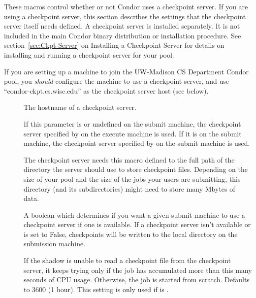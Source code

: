 These macros control whether or not Condor uses a checkpoint server.
If you are using a checkpoint server, this section
describes the settings that the checkpoint server itself needs
defined.  A checkpoint server is installed
separately. It is not included in the main Condor binary
distribution or installation procedure.  See
section~\ref{sec:Ckpt-Server} on Installing a Checkpoint Server
for details on installing and running a checkpoint server for your
pool.

\Note If you are setting up a machine to join the UW-Madison CS
Department Condor pool, you \emph{should} configure the machine to
use a checkpoint server, and use ``condor-ckpt.cs.wisc.edu'' as the
checkpoint server host (see below).

\begin{description}
  
\item[] \label{param:CkptServerHost} The
  hostname of a checkpoint server.

\item[]
  \label{param:StarterChoosesCkptServer} If this parameter is  
  or undefined on
  the submit machine, the checkpoint server specified by
   on the execute machine is used.  If it is
   on the submit machine, the checkpoint server
  specified by  on the submit machine is
  used.
  
\item[] \label{param:CkptServerDir} The
  checkpoint server needs this macro defined to the full path of the
  directory the server should use to store checkpoint files.
  Depending on the size of your pool and the size of the jobs your
  users are submitting, this directory (and its subdirectories) might
  need to store many Mbytes of data.

\item[] \label{param:UseCkptServer} A boolean
  which determines if you want a given submit machine to use a
  checkpoint server if one is available.  If a
  checkpoint server isn't available or  is set to
  False, checkpoints will be written to the local  directory on
  the submission machine.

\item[]
  \label{param:MaxDiscardedRunTime} If the shadow is unable to read a
  checkpoint file from the checkpoint server, it keeps trying only if
  the job has accumulated more than this many seconds of CPU usage.
  Otherwise, the job is started from scratch.  Defaults to 3600 (1
  hour). This setting is only used if  is
  .

\end{description}


